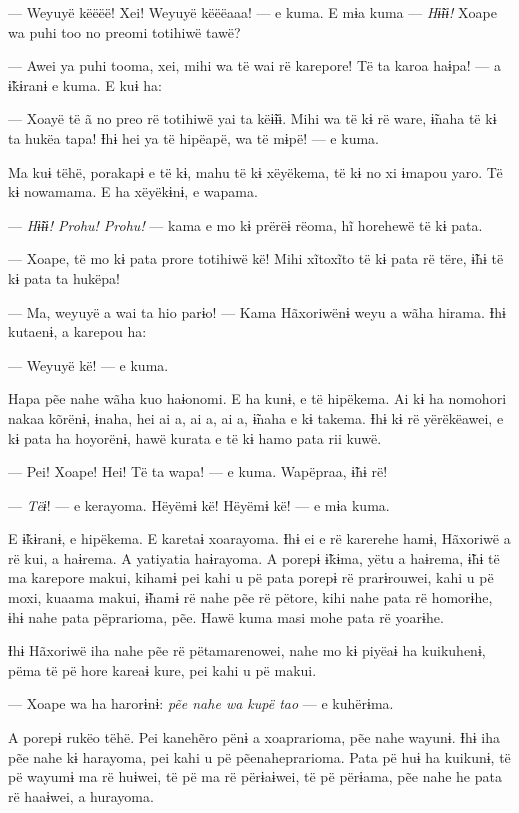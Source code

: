 --- Weyuyë këëëë! Xei! Weyuyë këëëaaa! --- e kuma. E mɨa kuma --- \textit{Hɨ̃ɨɨ!
}Xoape wa puhi too no preomi totihiwë tawë?

--- Awei ya puhi tooma, xei, mihi wa të wai rë karepore! Të ta karoa haɨpa!
--- a ɨ̃kɨranɨ e kuma. E kuɨ ha: 

--- Xoayë të ã no preo rë totihiwë yai ta këɨ̃ɨɨ. Mihi wa të kɨ rë ware,
ɨ̃naha të kɨ ta hukëa tapa! Ɨhɨ hei ya të hipëapë, wa të mɨpë! --- e
kuma. 

Ma kuɨ tëhë, porakapɨ e të kɨ, mahu të kɨ xëyëkema, të kɨ no xi ɨmapou
yaro. Të kɨ nowamama. E ha xëyëkɨnɨ, e wapama. 

--- \textit{Hɨ̃ɨɨ!  Prohu! Prohu!} --- kama e mo kɨ prërëɨ rëoma, hĩ horehewë të kɨ
pata. 

--- Xoape, të mo kɨ pata prore totihiwë kë! Mihi xĩtoxĩto të kɨ pata rë
tëre, ɨ̃hɨ të kɨ pata ta hukëpa!

--- Ma, weyuyë a wai ta hio parɨo! --- Kama Hãxoriwënɨ weyu a wãha hirama.
Ɨhɨ kutaenɨ, a karepou ha:

--- Weyuyë kë! --- e kuma. 

Hapa pẽe nahe wãha kuo haɨonomi. E ha kunɨ, e të hipëkema. Ai kɨ ha
nomohori nakaa kõrënɨ, ɨnaha, hei ai a, ai a, ai a, ɨ̃naha e kɨ takema.
Ɨhɨ kɨ rë yërëkëawei, e kɨ pata ha hoyorënɨ, hawë kurata e të kɨ hamo
pata rii kuwë. 

--- Pei! Xoape! Hei! Të ta wapa! --- e kuma. Wapëpraa, ɨ̃hɨ rë! 

--- \textit{Tëɨ}! --- e kerayoma. Hëyëmɨ kë! Hëyëmɨ kë! --- e mɨa kuma. 

E ɨ̃kɨranɨ, e hipëkema. E karetaɨ xoarayoma. Ɨhɨ ei e rë karerehe hamɨ,
 Hãxoriwë a rë kui, a haɨrema. A yatiyatia haɨrayoma. A porepɨ ɨ̃kɨma,
 yëtu a haɨrema, ɨ̃hɨ të ma karepore makui, kihamɨ pei kahi u pë pata
 porepɨ rë prarɨrouwei, kahi u pë moxi, kuaama makui, ɨ̃hamɨ rë nahe pẽe
 rë pëtore, kihi nahe pata rë homorɨhe, ɨhɨ nahe pata pëprarioma, pẽe.
 Hawë kuma masi mohe pata rë yoarɨhe. 

Ɨhɨ Hãxoriwë iha nahe pẽe rë pëtamarenowei, nahe mo kɨ piyëaɨ ha
 kuikuhenɨ, pëma të pë hore kareaɨ kure, pei kahi u pë makui.

--- Xoape wa ha harorɨnɨ: \textit{pẽe nahe wa kupë tao} --- e kuhërɨma. 

A porepɨ rukëo tëhë. Pei kanehẽro pënɨ a xoaprarioma, pẽe nahe wayunɨ.
 Ɨhɨ iha pẽe nahe kɨ harayoma, pei kahi u pë pẽenaheprarioma. Pata pë huɨ
 ha kuikunɨ, të pë wayumɨ ma rë huɨwei, të pë ma rë përɨaɨwei, të pë
 përɨama, pẽe nahe he pata rë haaɨwei, a hurayoma. 

